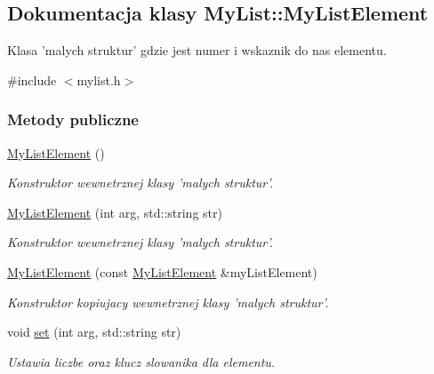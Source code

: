 \hypertarget{class_my_list_1_1_my_list_element}{\subsection{Dokumentacja klasy My\-List\-:\-:My\-List\-Element}
\label{class_my_list_1_1_my_list_element}
}


Klasa 'malych struktur' gdzie jest numer i wskaznik do nas elementu.  




{\ttfamily \#include $<$mylist.\-h$>$}

\subsubsection*{Metody publiczne}
\begin{DoxyCompactItemize}
\item 
\hyperlink{class_my_list_1_1_my_list_element_a75e80ebaeaa29e1d357ed0deab11c5a5}{My\-List\-Element} ()
\begin{DoxyCompactList}\small\item\em Konstruktor wewnetrznej klasy 'malych struktur'. \end{DoxyCompactList}\item 
\hyperlink{class_my_list_1_1_my_list_element_a6eda7fa9d2943deafe254dad392dfe12}{My\-List\-Element} (int arg, std\-::string str)
\begin{DoxyCompactList}\small\item\em Konstruktor wewnetrznej klasy 'malych struktur'. \end{DoxyCompactList}\item 
\hyperlink{class_my_list_1_1_my_list_element_a0bb4f6a8b5ef3b163698eee03624bfb9}{My\-List\-Element} (const \hyperlink{class_my_list_1_1_my_list_element}{My\-List\-Element} \&my\-List\-Element)
\begin{DoxyCompactList}\small\item\em Konstruktor kopiujacy wewnetrznej klasy 'malych struktur'. \end{DoxyCompactList}\item 
void \hyperlink{class_my_list_1_1_my_list_element_a817658ac5c1d6de5d8232877e4251bd9}{set} (int arg, std\-::string str)
\begin{DoxyCompactList}\small\item\em Ustawia liczbe oraz klucz slowanika dla elementu. \end{DoxyCompactList}\end{DoxyCompactItemize}

